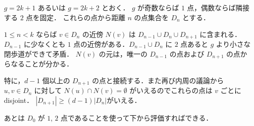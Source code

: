 \subsection{}
$g = 2k+1$ あるいは $g = 2k + 2$ とおく．
$g$ が奇数ならば $1$ 点，偶数ならば隣接する $2$ 点を固定．
これらの点から距離 $n$ の点集合を $D_n$ とする．

$1\leq n < k$ ならば $v\in D_n$ の近傍 $N(v)$ は $D_{n-1}\cup D_n \cup D_{n+1}$ に含まれる．
$D_{n-1}$ に少なくとも $1$ 点の近傍がある．$D_{n-1}\cup D_n$ に $2$ 点あると $g$ より小さな閉歩道ができて矛盾．
$N(v)$ の元は，唯一の $D_{n-1}$ の点および $D_{n+1}$ の点からなることが分かる．

特に，$d-1$ 個以上の $D_{n+1}$ の点と接続する．また再び内周の議論から $u,v \in D_n$ に対して
$N(u)\cap N(v) = \emptyset$ がいえるのでこれらの点は $v$ ごとにdisjoint．
$|D_{n+1}|\geq (d-1) |D_n|$がいえる．

あとは $D_0$ が $1$, $2$ 点であることを使って下から評価すればできる．

